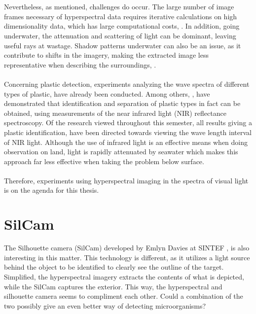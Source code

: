 \\\\
Nevertheless, as mentioned, challenges do occur. The large number of image frames necessary of hyperspectral data requires iterative calculations on high dimensionality data, which has large computational costs, \cite{mianji_2008}. In addition, going underwater, the attenuation and scattering of light can be dominant, leaving useful rays at wastage. Shadow patterns underwater can also be an issue, as it contribute to shifts in the imagery, making the extracted image less representative when describing the surroundings, \cite{sorensen2018}.
\\\\
\noindent
Concerning plastic detection, experiments analyzing the wave spectra of different types of plastic, have already been conducted. Among others, \cite{masoumi_safavi_2012}, have demonstrated that identification and separation of plastic types in fact can be obtained, using measurements of the near infrared light (NIR) reflectance spectroscopy. Of the research viewed throughout this semester, all results giving a plastic identification, have been directed towards viewing the wave length interval of NIR light. Although the use of infrared light is an effective means when doing observation on land, light is rapidly attenuated by seawater which makes this approach far less effective when taking the problem below surface.
\\\\
Therefore, experiments using hyperspectral imaging in the spectra of visual light is on the agenda for this thesis. 

\section{SilCam}
The Silhouette camera (SilCam) developed by Emlyn Davies at SINTEF \cite{davies_2018}, is also interesting in this matter. This technology is different, as it utilizes a light source behind the object to be identified to clearly see the outline of the target. Simplified, the hyperspectral imagery extracts the contents of what is depicted, while the SilCam captures the exterior. This way, the hyperspectral and silhouette camera seems to compliment each other. Could a combination of the two possibly give an even better way of detecting microorganisms?

